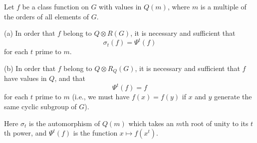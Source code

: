 Let $f$ be a class function on $G$ with values in $Q(m)$, where $m$ is a multiple of the orders of all elements of $G$.

(a) In order that $f$ belong to $Q \otimes R(G)$, it is necessary and sufficient that
$$\sigma_t(f) = \Psi^t(f)$$
for each $t$ prime to $m$.

(b) In order that $f$ belong to $Q \otimes R_Q(G)$, it is necessary and sufficient that $f$ have values in $Q$, and that
$$\Psi^t(f) = f$$
for each $t$ prime to $m$ (i.e., we must have $f(x) = f(y)$ if $x$ and $y$ generate the same cyclic subgroup of $G$).

Here $\sigma_t$ is the automorphism of $Q(m)$ which takes an $m$th root of unity to its $t$th power, and $\Psi^t(f)$ is the function $x \mapsto f(x^t)$.
